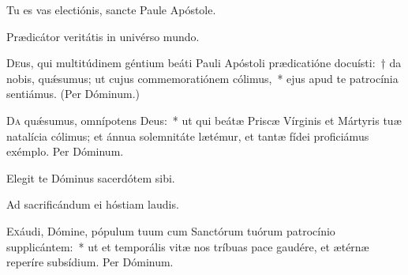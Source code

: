 \documentclass[vesperale_romanum.tex]{subfiles}
\begin{document}

\vv Tu es vas electiónis, sancte Paule Apóstole.

\rr Prædicátor veritátis in univérso mundo.

\oratio

\lettrine{D}{e}us, qui multitúdinem géntium beáti Pauli Apóstoli prædicatióne docuísti:~† da nobis, quǽsumus; ut cujus commemoratiónem cólimus,~* ejus apud te patrocínia sentiámus. (Per Dóminum.)



\oratio

\lettrine{D}{a} quǽsumus, omnípotens Deus:~* ut qui beátæ Priscæ Vírginis et Mártyris tuæ natalícia cólimus; et ánnua solemnitáte lætémur, et tantæ fídei proficiámus exémplo.
Per Dóminum.


 

\vv Elegit te Dóminus sacerdótem sibi.

\rr Ad sacrificándum ei hóstiam laudis.



\myrule


\simplex


\oratio

\lettrine{E}{x}áudi, Dómine, pópulum tuum cum Sanctórum tuórum patrocínio supplicántem:~* ut et temporális vitæ nos tríbuas pace gaudére, et ætérnæ reperíre subsídium.
Per Dóminum.
\end{document}
